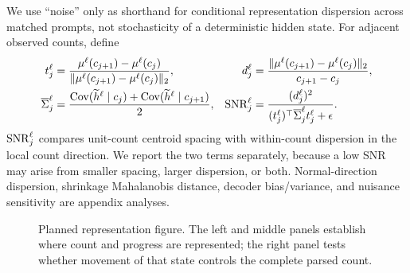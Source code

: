 We use ``noise'' only as shorthand for conditional representation dispersion across matched prompts, not stochasticity of a deterministic hidden state. For adjacent observed counts, define
\begin{align}
t_j^\ell
&=
\frac{\mu^\ell(c_{j+1})-\mu^\ell(c_j)}
{\|\mu^\ell(c_{j+1})-\mu^\ell(c_j)\|_2},
&
d_j^\ell
&=
\frac{\|\mu^\ell(c_{j+1})-\mu^\ell(c_j)\|_2}{c_{j+1}-c_j},\\
\overline\Sigma_j^\ell
&=
\frac{\operatorname{Cov}(\widetilde h^\ell\mid c_j)+
\operatorname{Cov}(\widetilde h^\ell\mid c_{j+1})}{2},
&
\operatorname{SNR}_j^\ell
&=
\frac{(d_j^\ell)^2}
{(t_j^\ell)^\top\overline\Sigma_j^\ell t_j^\ell+\epsilon}.
\label{eq:state-snr}
\end{align}
\(\operatorname{SNR}_j^\ell\) compares unit-count centroid spacing with within-count dispersion in the local count direction. We report the two terms separately, because a low SNR may arise from smaller spacing, larger dispersion, or both. Normal-direction dispersion, shrinkage Mahalanobis distance, decoder bias/variance, and nuisance sensitivity are appendix analyses.

\begin{figure}[H]
\centering
{}
\caption{Planned representation figure. The left and middle panels establish where count and progress are represented; the right panel tests whether movement of that state controls the complete parsed count.}
\label{fig:counter-todo}
\end{figure}

